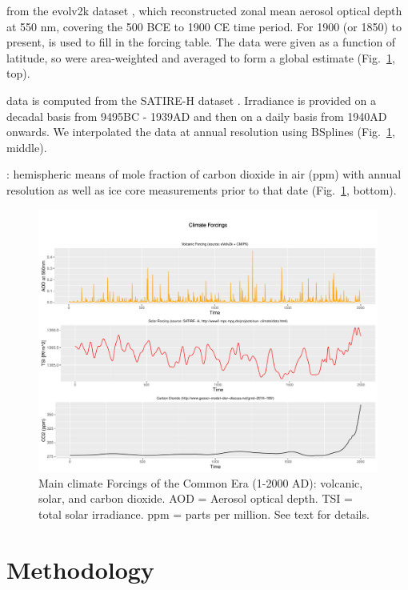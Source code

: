 \documentclass[12pt]{amsart}
\theoremstyle{plain}
\theoremstyle{definition}
\theoremstyle{remark}
\begin{document}
 from the evolv2k dataset
  \citep{Toohey2016}, which reconstructed zonal mean aerosol optical depth at 550 nm, covering the 500 BCE to 1900 CE time period. For 1900 (or 1850) to present, \cite{Thomason2016} is
  used to fill in the forcing table. The data were given as a function of latitude, so were area-weighted and averaged to form a global estimate (Fig.~\ref{fig:forcings}, top).
  
 data is computed from the SATIRE-H
   dataset \citep{Vieira2011}. Irradiance is
  provided on a decadal basis from 9495BC - 1939AD and then on a daily basis
  from 1940AD onwards. We interpolated the data at annual resolution using BSplines (Fig.~\ref{fig:forcings}, middle). 
  
: hemispheric means of mole
  fraction of carbon dioxide in air (ppm) with annual
  resolution \citep{Meinshausen_GMD2017} as well as ice core measurements prior to that date \citep{JungclausGMD17} (Fig.~\ref{fig:forcings}, bottom).


\begin{figure}
  \centering
  \includegraphics[scale=0.40]{forcings}
  \caption{Main climate Forcings of the Common Era (1-2000 AD): volcanic, solar, and carbon dioxide. AOD = Aerosol optical depth. TSI = total solar irradiance. ppm = parts per million. See text for details.}
  \label{fig:forcings}
\end{figure}

\section{Methodology}\label{sec:model}
\end{document}
